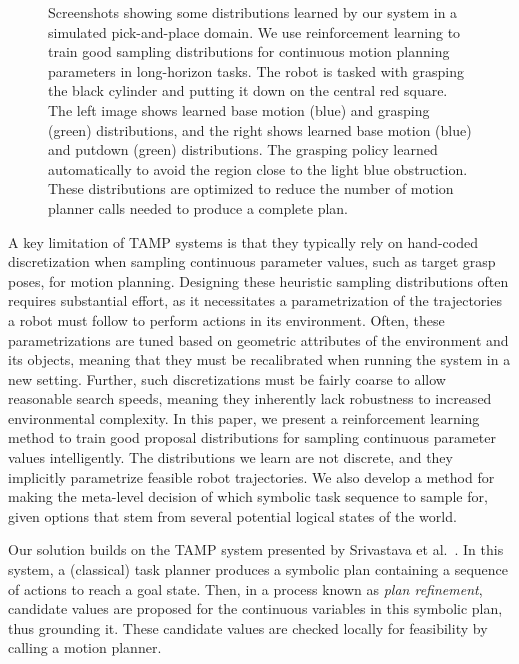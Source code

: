 \begin{figure}[t]
  \caption{Screenshots showing some distributions learned by our system in a simulated pick-and-place
    domain. We use reinforcement learning to train good sampling distributions for continuous motion
    planning parameters in long-horizon tasks. The robot is tasked with grasping the black cylinder and putting it down on the
    central red square. The left image shows learned base motion (blue) and grasping (green) distributions,
    and the right shows learned base motion (blue) and putdown (green) distributions. The grasping policy
    learned automatically to avoid the region close to the light blue obstruction. These distributions are
    optimized to reduce the number of motion planner calls needed to produce a complete plan.}
  \label{fig:cover}
\end{figure}

A key limitation of TAMP systems is that they typically rely on hand-coded discretization when
sampling continuous parameter values, such as target grasp poses, for motion planning.
Designing these heuristic sampling distributions often requires substantial effort, as it necessitates
a parametrization of the trajectories a robot must follow to perform actions in its environment.
Often, these parametrizations are tuned based on geometric attributes of the environment and its objects,
meaning that they must be recalibrated when running the system in a new setting. Further,
such discretizations must be fairly coarse to allow reasonable search speeds, meaning they inherently lack
robustness to increased environmental complexity. In this paper, we present a reinforcement
learning method to train good proposal distributions for sampling continuous parameter
values intelligently. The distributions we learn are not discrete, and they implicitly parametrize feasible
robot trajectories. We also develop a method for making the meta-level decision of which
symbolic task sequence to sample for, given options that stem from several potential logical
states of the world.

Our solution builds on the TAMP system
presented by Srivastava et al.~\cite{srivastava2014combined}.
In this system, a (classical) task planner produces a symbolic plan containing
a sequence of actions to reach a goal state. Then, in a process known as \emph{plan refinement},
candidate values are proposed for the continuous variables in this symbolic plan, thus grounding it.
These candidate values are checked locally for feasibility by calling a motion planner.

